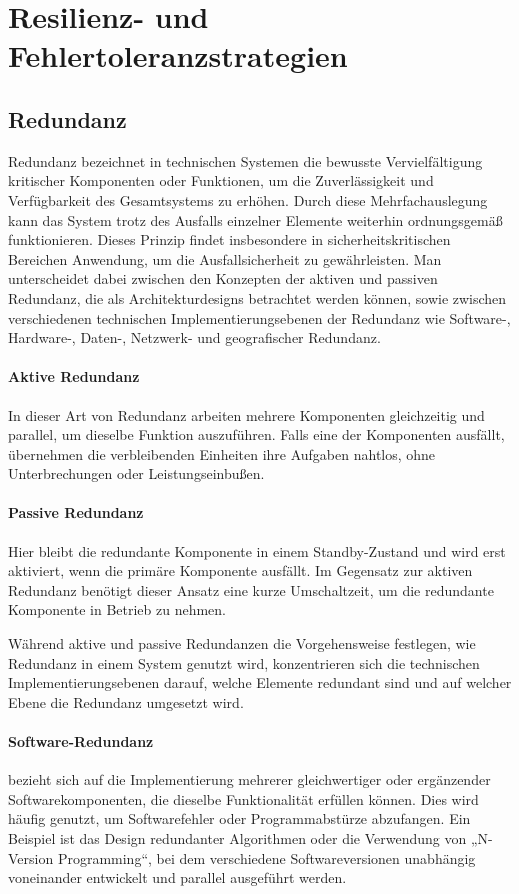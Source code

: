 \section{Resilienz- und Fehlertoleranzstrategien}

\subsection{Redundanz}

Redundanz bezeichnet in technischen Systemen die bewusste Vervielfältigung kritischer Komponenten oder Funktionen,
um die Zuverlässigkeit und Verfügbarkeit des Gesamtsystems zu erhöhen.
Durch diese Mehrfachauslegung kann das System trotz des Ausfalls einzelner Elemente weiterhin ordnungsgemäß
funktionieren.
Dieses Prinzip findet insbesondere in sicherheitskritischen Bereichen Anwendung, um die Ausfallsicherheit
zu gewährleisten. Man unterscheidet dabei zwischen den Konzepten der aktiven und passiven Redundanz, die als Architekturdesigns betrachtet werden können, sowie zwischen verschiedenen technischen Implementierungsebenen der Redundanz wie Software-, Hardware-, Daten-, Netzwerk- und geografischer Redundanz.

\paragraph{Aktive Redundanz}
In dieser Art von Redundanz arbeiten mehrere Komponenten gleichzeitig und parallel, um dieselbe Funktion auszuführen. Falls eine der Komponenten ausfällt, übernehmen die verbleibenden Einheiten ihre Aufgaben nahtlos, ohne Unterbrechungen oder Leistungseinbußen. 

\paragraph{Passive Redundanz}
Hier bleibt die redundante Komponente in einem Standby-Zustand und wird erst aktiviert, wenn die primäre Komponente ausfällt. Im Gegensatz zur aktiven Redundanz benötigt dieser Ansatz eine kurze Umschaltzeit, um die redundante Komponente in Betrieb zu nehmen.

Während aktive und passive Redundanzen die Vorgehensweise festlegen, wie Redundanz in einem System genutzt wird, konzentrieren sich die technischen Implementierungsebenen darauf, welche Elemente redundant sind und auf welcher Ebene die Redundanz umgesetzt wird. 

    \paragraph{Software-Redundanz} bezieht sich auf die Implementierung mehrerer gleichwertiger oder ergänzender Softwarekomponenten, die dieselbe Funktionalität erfüllen können. Dies wird häufig genutzt, um Softwarefehler oder Programmabstürze abzufangen. Ein Beispiel ist das Design redundanter Algorithmen oder die Verwendung von „N-Version Programming“, bei dem verschiedene Softwareversionen unabhängig voneinander entwickelt und parallel ausgeführt werden.
